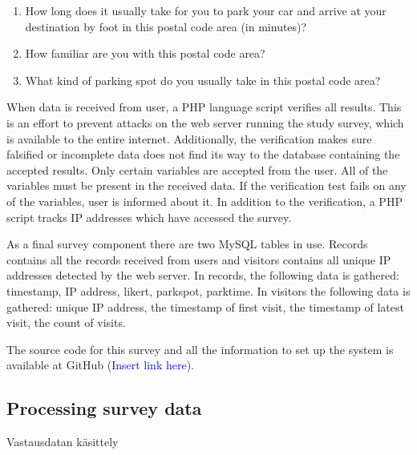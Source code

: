 \begin{spacing}{1}
\begin{enumerate}
  \item How long does it usually take for you to park your car and arrive at your destination by foot in this postal code area (in minutes)?
  \item How familiar are you with this postal code area?
  \item What kind of parking spot do you usually take in this postal code area?
\end{enumerate}
\end{spacing}

\noindent
When data is received from user, a PHP language script verifies all results. This is an effort to prevent attacks on the web server running the study survey, which is available to the entire internet. Additionally, the verification makes sure falsified or incomplete data does not find its way to the database containing the accepted results. Only certain variables are accepted from the user. All of the variables must be present in the received data. If the verification test fails on any of the variables, user is informed about it. In addition to the verification, a PHP script tracks IP addresses which have accessed the survey.

As a final survey component there are two MySQL tables in use. Records contains all the records received from users and visitors contains all unique IP addresses detected by the web server. In records, the following data is gathered: timestamp, IP address, likert, parkspot, parktime. In visitors the following data is gathered: unique IP address, the timestamp of first visit, the timestamp of latest visit, the count of visits.

The source code for this survey and all the information to set up the system is available at GitHub (\textcolor{blue}{Insert link here}).

\subsection{Processing survey data}
\justify
Vastausdatan käsittely